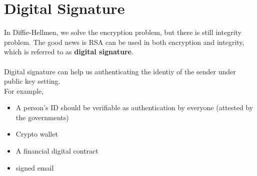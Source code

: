 \documentclass{scribe}
\begin{document}
\section{Digital Signature}
In Diffie-Hellmen, we solve the encryption problem, but there is still integrity problem. The good news is RSA can be used in both encryption and integrity, which is referred to as \textbf{digital signature}.
\\\\
Digital signature can help us authenticating the identiy of the sender under public key setting.
\\
For example,
\begin{itemize}
    \item A person's ID should be verifiable as authentication by everyone (attested by the governments)
    \item Crypto wallet
    \item A financial digital contract
    \item signed email
\end{itemize}
\vspace{10mm}
\end{document}
